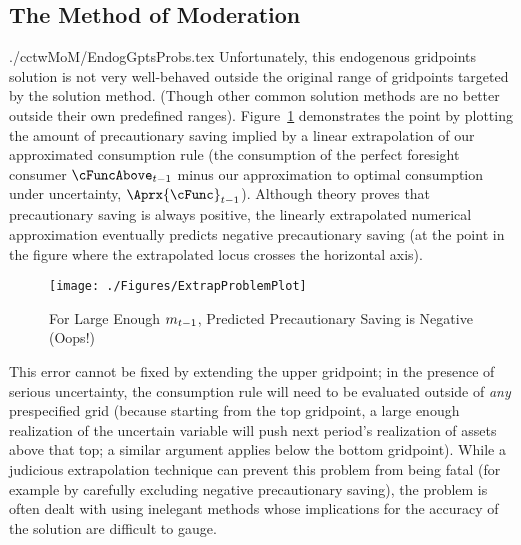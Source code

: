 \documentclass[SolvingMicroDSOPs]{subfiles}
\begin{document}
\hypertarget{the-method-of-moderation}{}
\subsection{The Method of Moderation}\label{sec:method-of-moderation}

\begin{verbatimwrite}{./cctwMoM/EndogGptsProbs.tex}
  Unfortunately, this endogenous gridpoints solution is not very
  well-behaved outside the original range of gridpoints targeted by
  the solution method.  (Though other common solution methods are no
  better outside their own predefined ranges).
  Figure~\ref{fig:ExtrapProblem} demonstrates the point by plotting
  the amount of precautionary saving implied by a linear extrapolation
  of our approximated consumption rule (the consumption of the perfect
  foresight consumer $\cFuncAbove_{\prd-1}$ minus our approximation to
  optimal consumption under uncertainty, $\Aprx{\cFunc}_{\prd-1}$).
  Although theory proves that precautionary saving is always positive,
  the linearly extrapolated numerical approximation eventually
  predicts negative precautionary saving (at the point in the figure
  where the extrapolated locus crosses the horizontal axis).

  \hypertarget{ExtrapProblemPlot}{}
  \begin{figure}
    \texttt{[image: ./Figures/ExtrapProblemPlot]}
    \caption{For Large Enough $m_{t-1}$, Predicted Precautionary Saving is Negative (Oops!)}
    \label{fig:ExtrapProblem}
  \end{figure}

  This error cannot be fixed by extending the upper gridpoint; in the presence of serious uncertainty, the consumption rule will need to be evaluated outside of \textit{any} prespecified grid (because starting from the top gridpoint, a large enough realization of the uncertain variable will push next period's realization of assets above that top; a similar argument applies below the bottom gridpoint).  While a judicious extrapolation technique can prevent this problem from being fatal (for example by carefully excluding negative precautionary saving), the problem is often dealt with using inelegant methods whose implications for the accuracy of the solution are difficult to gauge.
\end{verbatimwrite}
\unskip


\end{document}
